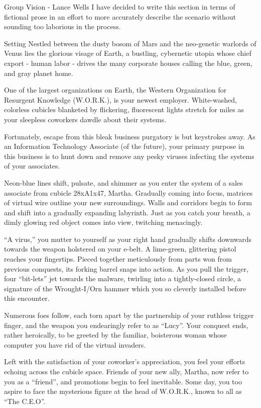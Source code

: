 \documentclass[12pt]{report}
\begin{document}
\begin{section}{Group Vision - Lance Wells}
I have decided to write this section in terms of fictional prose in an 
effort to more accurately describe the scenario without sounding too
laborious in the process.

\begin{subsection}{Setting}
Nestled between the dusty bosom of Mars and the neo-genetic warlords of
Venus lies the glorious visage of Earth, a bustling, cybernetic utopia whose
chief export - human labor - drives the many corporate houses calling the
blue, green, and gray planet home.

One of the largest organizations on Earth, the Western Organization for
Resurgent Knowledge (W.O.R.K.), is your newest employer. White-washed,
colorless cubicles blanketed by flickering, fluorescent lights stretch for
miles as your sleepless coworkers dawdle about their systems.

Fortunately, escape from this bleak business purgatory is but keystrokes
away. As an Information Technology Associate (of the future), your primary
purpose in this business is to hunt down and remove any pesky viruses
infecting the systems of your associates.

Neon-blue lines shift, pulsate, and shimmer as you enter the system of a
sales associate from cubicle 28xA1x47, Martha. Gradually coming into focus,
matrices of virtual wire outline your new surroundings. Walls and corridors
begin to form and shift into a gradually expanding labyrinth. Just as you
catch your breath, a dimly glowing red object comes into view, twitching
menacingly.

``A virus,'' you mutter to yourself as your right hand gradually shifts
downwards towards the weapon holstered on your e-belt. A lime-green,
glittering pistol reaches your fingertips. Pieced together meticulously from
parts won from previous conquests, its forking barrel snaps into action. As
you pull the trigger, four ``bit-lets'' jet towards the malware, twirling
into a tightly-closed circle, a signature of the Wrought-I/Orn hammer which
you so cleverly installed before this encounter.

Numerous foes follow, each torn apart by the partnership of your ruthless
trigger finger, and the weapon you endearingly refer to as ``Lucy''. Your
conquest ends, rather heroically, to be greeted by the familiar, boisterous
woman whose computer you have rid of the virtual invaders.

Left with the satisfaction of your coworker's appreciation, you feel your
efforts echoing across the cubicle space. Friends of your new ally, Martha,
now refer to you as a ``friend'', and promotions begin to feel inevitable.
Some day, you too aspire to face the mysterious figure at the head of
W.O.R.K., known to all as ``The C.E.O''.
\end{subsection}


\end{section}
\end{document}
